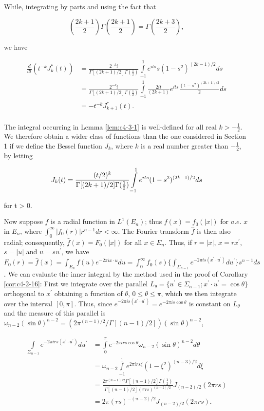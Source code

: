 While, integrating by parts and using the fact that

\[
\left(\frac{2k+1}{2}\right)\Gamma\left(\frac{2k+1}{2}\right)=\Gamma\left(\frac{2k+3}{2}\right),
\]

we have

\[
\begin{aligned}\frac{d}{dt}(t^{-k}J^{*}_{k}(t))&=\frac{2^{-k}i}{\Gamma[(2k+1)/2]\Gamma(\frac{1}{2})}\int\limits_{-1}^{1}e^{its}s(1-s^{2})^{(2k-1)/2}ds\\&=\frac{2^{-k}i}{\Gamma[(2k+1)/2]\Gamma(\frac{1}{2})}\int\limits_{-1}^{1}\frac{2it}{(2k+1)}e^{its}\frac{(1-s^{2})^{(2k+1)/2}}{2}ds\\&=-t^{-k}J^{*}_{k+1}(t).\\ \end{aligned}
\]

The integral occurring in Lemma \ref{lem:c4-3-1} is well-defined for all real $k > -\frac{1}{2}$. We therefore obtain a wider class of functions than the one considered in Section 1 if we define the Bessel function $J_k$, where $k$ is a real number greater than $-\frac{1}{2}$, by letting

\[
J_{k}(t)=\frac{(t/2)^{k}}{\Gamma[(2k+1)/2]\Gamma(\frac{1}{2})} \intop_{-1}^{1}e^{i t s}(1-s^{2})^{(2k-1)/2} d s
\]

for t > 0.

Now suppose $f$ is a radial function in $L^{1}(E_{n})$; thus $f(x) = f_{0}(|x|)$ for $a.e.$ $x$ in $E_{n}$, where $\int_{0}^{\infty} |f_{0}(r)|r^{n-1}dr < \infty$. The Fourier transform $\hat{f}$ is then also radial; consequently, $\hat{f}(x) = F_{0}(|x|)$ for all $x \in E_{n}$. Thus, if $r = |x|$, $x = rx^{\prime}$, $s = |u|$ and $u = su^{\prime}$, we have $F_{0}(r) = \hat{f}(x) = \int_{E_{n}} f(u)e^{-2\pi i x \cdot u} du = \int_{0}^{\infty} f_{0}(s)\{\int_{\Sigma_{n-1}} e^{-2\pi i s(x^{\prime}\cdot u^{\prime})} du^{\prime}\}s^{n-1}ds$. We can evaluate the inner integral by the method used in the proof of Corollary \ref{cor:c4-2-16}: First we integrate over the parallel $L_{\theta} = \{u^{\prime} \in \Sigma_{n-1}; x^{\prime} \cdot u^{\prime} = \cos \theta\}$ orthogonal to $x^{\prime}$ obtaining a function of $\theta$, $0 \leq \theta \leq \pi$, which we then integrate over the interval $[0, \pi]$. Thus, since $e^{-2\pi i s(x^{\prime}\cdot u^{\prime})} = e^{-2\pi i s\cos\theta}$ is constant on $L_{\theta}$ and the measure of this parallel is $\omega_{n-2}(\sin \theta)^{n-2} = (2\pi^{(n-1)/2}/\Gamma[(n-1)/2]) (\sin \theta)^{n-2}$,

\[
\begin{aligned}\int\limits_{\Sigma_{n-1}}e^{-2\pi i r s(x^{\prime}\cdot u^{\prime})}du^{\prime}&=\int\limits_{0}^{\pi}e^{-2\pi i r s\cos\theta}\omega_{n-2}(\sin\theta)^{n-2}d\theta\\&=\omega_{n-2}\int\limits_{-1}^{1}e^{2\pi i r s\xi}(1-\xi^{2})^{(n-3)/2}d\xi\\&=\frac{2\pi^{(n-1)/2}\Gamma[(n-1)/2]\Gamma(\frac{1}{2})}{\Gamma[(n-1)/2](\pi r s)^{(n-2)/2}}J_{(n-2)/2}(2\pi r s)\\&=2\pi(r s)^{-(n-2)/2}J_{(n-2)/2}(2\pi r s).\end{aligned}
\]

